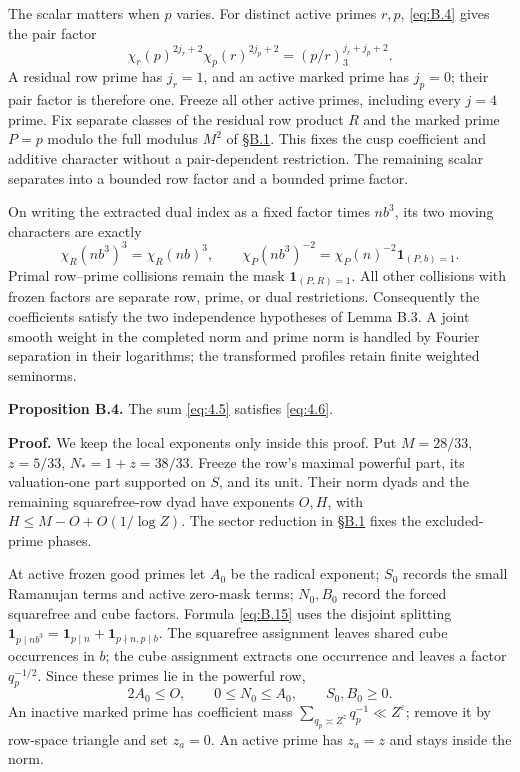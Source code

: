 \documentclass[11pt,a4paper]{article}
\begin{document}
The scalar matters when \(p\) varies. For distinct active primes \(r,p\), \eqref{eq:B.4} gives the pair factor \[
\chi_r(p)^{2j_r+2}\chi_p(r)^{2j_p+2}
=(p/r)_3^{j_r+j_p+2}.
\] A residual row prime has \(j_r=1\), and an active marked prime has \(j_p=0\); their pair factor is therefore one. Freeze all other active primes, including every \(j=4\) prime. Fix separate classes of the residual row product \(R\) and the marked prime \(P=p\) modulo the full modulus \(M^2\) of \hyperref[sec:B.1]{§B.1}. This fixes the cusp coefficient and additive character without a pair-dependent restriction. The remaining scalar separates into a bounded row factor and a bounded prime factor.

On writing the extracted dual index as a fixed factor times \(nb^3\), its two moving characters are exactly \[
\chi_R(nb^3)^3=\chi_R(nb)^3,\qquad
\chi_P(nb^3)^{-2}=\chi_P(n)^{-2}\mathbf1_{(P,b)=1}.
\] Primal row--prime collisions remain the mask \(\mathbf1_{(P,R)=1}\). All other collisions with frozen factors are separate row, prime, or dual restrictions. Consequently the coefficients satisfy the two independence hypotheses of Lemma B.3. A joint smooth weight in the completed norm and prime norm is handled by Fourier separation in their logarithms; the transformed profiles retain finite weighted seminorms.

\textbf{Proposition B.4.} The sum \eqref{eq:4.5} satisfies \eqref{eq:4.6}.

\textbf{Proof.} We keep the local exponents only inside this proof. Put \(M=28/33\), \(z=5/33\), \(N_*=1+z=38/33\). Freeze the row's maximal powerful part, its valuation-one part supported on \(S\), and its unit. Their norm dyads and the remaining squarefree-row dyad have exponents \(O,H\), with \(H\le M-O+O(1/\log Z)\). The sector reduction in \hyperref[sec:B.1]{§B.1} fixes the excluded-prime phases.

At active frozen good primes let \(A_0\) be the radical exponent; \(S_0\) records the small Ramanujan terms and active zero-mask terms; \(N_0,B_0\) record the forced squarefree and cube factors. Formula \eqref{eq:B.15} uses the disjoint splitting \(\mathbf1_{p\mid nb^3}=\mathbf1_{p\mid n}+\mathbf1_{p\nmid n,p\mid b}\). The squarefree assignment leaves shared cube occurrences in \(b\); the cube assignment extracts one occurrence and leaves a factor \(q_p^{-1/2}\). Since these primes lie in the powerful row, \[
 2A_0\le O,\qquad 0\le N_0\le A_0,\qquad S_0,B_0\ge0.
\] An inactive marked prime has coefficient mass \(\sum_{q_p\asymp Z^z}q_p^{-1}\ll Z^\varepsilon\); remove it by row-space triangle and set \(z_a=0\). An active prime has \(z_a=z\) and stays inside the norm.
\end{document}
